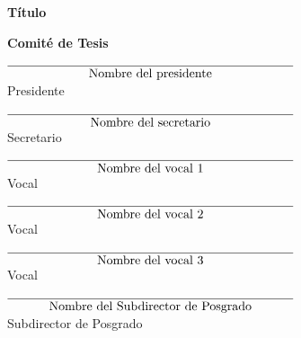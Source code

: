 \begin{titlepage}
    
    \begin{center}
    \textbf{Título}\\
    
    \vspace{0.8cm}
    
        \textbf{Comité de Tesis}
        
          \vspace{0.7cm}
        
         $\underset{\text{\normalsize Nombre del presidente}}{\underline{\hspace{8cm}}}$\\
         \vspace{0.2cm}
         \textrm{Presidente}
         
        \vspace{0.7cm}
         
         $\underset{\text{\normalsize Nombre del secretario}}{\underline{\hspace{8cm}}}$\\
         \vspace{0.2cm}
         \textrm{Secretario}
         
         \vspace{0.7cm}
         
        $\underset{\text{\normalsize Nombre del vocal 1}}{\underline{\hspace{8cm}}}$\\
         \vspace{0.2cm}
         \textrm{Vocal}
         
         \vspace{0.7cm}
         
         $\underset{\text{\normalsize Nombre del vocal 2}}{\underline{\hspace{8cm}}}$\\
         \vspace{0.2cm}
         \textrm{Vocal}
         
         \vspace{0.7cm}
         
         $\underset{\text{\normalsize Nombre del vocal 3}}{\underline{\hspace{8cm}}}$\\
         \vspace{0.2cm}
         \textrm{Vocal}
         
         \vspace{0.7cm}
        
         $\underset{\text{\normalsize Nombre del Subdirector de Posgrado}}{\underline{\hspace{8cm}}}$\\
         \vspace{0.2cm}
         \textrm{Subdirector de Posgrado}
        
    \end{center}
\end{titlepage}
    